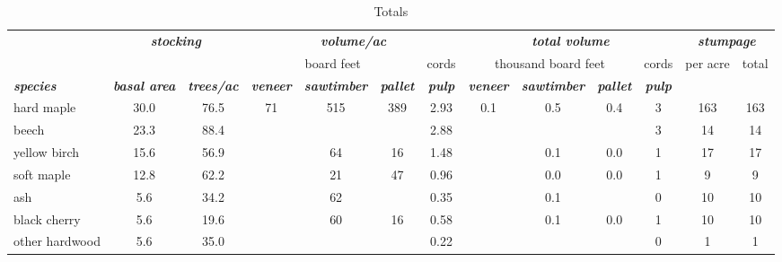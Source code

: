 \documentclass[landscape]{article}
\begin{document}
\begin{table}[H]

\caption{\label{tab:unnamed-chunk-65}Totals}
\fontsize{10}{12}\selectfont
\begin{tabular}[t]{lcccccccccccc}
\toprule
\multicolumn{1}{c}{\em{\textbf{ }}} & \multicolumn{2}{c}{\em{\textbf{stocking}}} & \multicolumn{4}{c}{\em{\textbf{volume/ac }}} & \multicolumn{4}{c}{\em{\textbf{total volume}}} & \multicolumn{2}{c}{\em{\textbf{stumpage}}} \\
\cmidrule(l{3pt}r{3pt}){2-3} \cmidrule(l{3pt}r{3pt}){4-7} \cmidrule(l{3pt}r{3pt}){8-11} \cmidrule(l{3pt}r{3pt}){12-13}
\multicolumn{3}{c}{ } & \multicolumn{3}{c}{board feet} & \multicolumn{1}{c}{cords} & \multicolumn{3}{c}{thousand board feet} & \multicolumn{1}{c}{cords} & \multicolumn{1}{c}{per acre} & \multicolumn{1}{c}{total} \\
\cmidrule(l{3pt}r{3pt}){4-6} \cmidrule(l{3pt}r{3pt}){7-7} \cmidrule(l{3pt}r{3pt}){8-10} \cmidrule(l{3pt}r{3pt}){11-11} \cmidrule(l{3pt}r{3pt}){12-12} \cmidrule(l{3pt}r{3pt}){13-13}
\rowcolor[HTML]{DCDCDC}  \em{\textbf{species}} & \em{\textbf{basal area}} & \em{\textbf{trees/ac}} & \em{\textbf{veneer}} & \em{\textbf{sawtimber}} & \em{\textbf{pallet}} & \em{\textbf{pulp}} & \em{\textbf{veneer}} & \em{\textbf{sawtimber}} & \em{\textbf{pallet}} & \em{\textbf{pulp}} & \em{\textbf{ }} & \em{\textbf{ }}\\
\midrule
\rowcolor{gray!6}  hard maple & 30.0 & 76.5 & 71 & 515 & 389 & 2.93 & 0.1 & 0.5 & 0.4 & 3 & 163 & 163\\
 
beech & 23.3 & 88.4 &  &  &  & 2.88 &  &  &  & 3 & 14 & 14\\
 
\rowcolor{gray!6}  yellow birch & 15.6 & 56.9 &  & 64 & 16 & 1.48 &  & 0.1 & 0.0 & 1 & 17 & 17\\
 
soft maple & 12.8 & 62.2 &  & 21 & 47 & 0.96 &  & 0.0 & 0.0 & 1 & 9 & 9\\
 
\rowcolor{gray!6}  ash & 5.6 & 34.2 &  & 62 &  & 0.35 &  & 0.1 &  & 0 & 10 & 10\\
 
black cherry & 5.6 & 19.6 &  & 60 & 16 & 0.58 &  & 0.1 & 0.0 & 1 & 10 & 10\\
 
\rowcolor{gray!6}  other hardwood & 5.6 & 35.0 &  &  &  & 0.22 &  &  &  & 0 & 1 & 1\\
 

\end{tabular}
\end{table}
\end{document}
